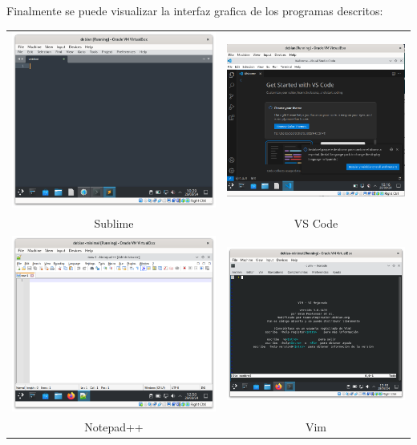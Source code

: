 \documentclass{article}
\begin{document}
    \newpage

    Finalmente se puede visualizar la interfaz grafica de los programas descritos: \\
    
        \begin{tabular}{cc}
        \includegraphics[width=.4\linewidth,valign=m]{capturas_paquetes/sublime.png} & \includegraphics[width=.4\linewidth,valign=m]{capturas_paquetes/vscode.png} \\
        Sublime & VS Code \\
        \includegraphics[width=.4\linewidth,valign=m]{capturas_paquetes/notepad.png} & \includegraphics[width=.4\linewidth,valign=m]{capturas_paquetes/vim.png} \\
        Notepad++ & Vim \\
    \end{tabular}
\end{document}
